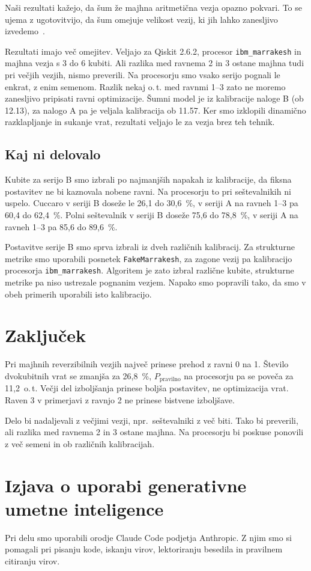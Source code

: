 Naši rezultati kažejo,
da šum že majhna aritmetična vezja opazno pokvari.
To se ujema z ugotovitvijo, da šum omejuje velikost vezij,
ki jih lahko zanesljivo izvedemo~\cite{preskill2018}.

Rezultati imajo več omejitev.
Veljajo za Qiskit 2.6.2, procesor \texttt{ibm\_marrakesh}
in majhna vezja s 3 do 6 kubiti.
Ali razlika med ravnema 2 in 3
ostane majhna tudi pri večjih vezjih, nismo preverili.
Na procesorju smo vsako serijo pognali le enkrat,
z enim semenom.
Razlik nekaj o.\,t. med ravnmi 1--3
zato ne moremo zanesljivo pripisati ravni optimizacije.
Šumni model je iz kalibracije naloge B (ob 12.13),
za nalogo A pa je veljala kalibracija ob 11.57.
Ker smo izklopili dinamično razklapljanje in sukanje vrat,
rezultati veljajo le za vezja brez teh tehnik.

\subsection{Kaj ni delovalo}
\label{g10:sec:neuspehi}

Kubite za serijo B smo izbrali po najmanjših napakah
iz kalibracije, da fiksna postavitev
ne bi kaznovala nobene ravni.
Na procesorju to pri seštevalnikih ni uspelo.
Cuccaro v seriji B doseže le 26,1 do 30,6~\%,
v seriji A na ravneh 1--3 pa 60,4 do 62,4~\%.
Polni seštevalnik v seriji B doseže 75,6 do 78,8~\%,
v seriji A na ravneh 1--3 pa 85,6 do 89,6~\%.

Postavitve serije B smo sprva izbrali iz dveh različnih
kalibracij. Za strukturne metrike smo uporabili posnetek
\texttt{FakeMarrakesh}, za zagone vezij pa kalibracijo
procesorja \texttt{ibm\_marrakesh}. Algoritem je zato 
izbral različne kubite, strukturne metrike pa niso ustrezale 
pognanim vezjem.
Napako smo popravili tako, da smo v obeh primerih uporabili isto
kalibracijo.


\section{Zaključek}
\label{g10:sec:zakljucek}

Pri majhnih reverzibilnih vezjih
največ prinese prehod z ravni 0 na 1.
Število dvokubitnih vrat se zmanjša za 26,8~\%,
$P_\text{pravilno}$ na procesorju pa se poveča za 11,2~o.\,t.
Večji del izboljšanja prinese boljša postavitev,
ne optimizacija vrat.
Raven 3 v primerjavi z ravnjo 2
ne prinese bistvene izboljšave.

Delo bi nadaljevali z večjimi vezji,
npr.\ seštevalniki z več biti.
Tako bi preverili, ali razlika med ravnema 2 in 3
ostane majhna.
Na procesorju bi poskuse ponovili z več semeni
in ob različnih kalibracijah.


\section*{Izjava o uporabi generativne umetne inteligence}

Pri delu smo uporabili orodje Claude Code podjetja Anthropic.
Z njim smo si pomagali pri pisanju kode,
iskanju virov, lektoriranju besedila
in pravilnem citiranju virov.
